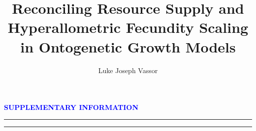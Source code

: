\documentclass[a4paper]{article} %
\title{Reconciling Resource Supply and Hyperallometric Fecundity Scaling in Ontogenetic Growth Models}
\author{Luke Joseph Vassor}
\begin{document}
\begin{titlepage}
    
    \makeatletter
    \linespread{1.5} %
    {\huge\bfseries\textcolor{blue}{SUPPLEMENTARY INFORMATION}\par}
    \vspace{0.1cm}
    \hrule
    \vspace{0.1cm}
    \hrule
    \center %
    \vspace{2cm}
        
    \vspace{2cm} %
    \tableofcontents
\end{titlepage}
\end{document}
